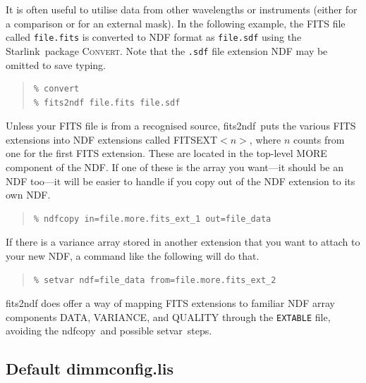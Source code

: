 \documentclass[twoside,11pt]{article}
\newcommand{\htmladdnormallink}[2]{#1}
\newcommand{\xref}[3]{#1}
\newcommand{\xlabel}[1]{}
\renewcommand{\_}{\texttt{\symbol{95}}}
\newenvironment{myquote}{
   \color{MidnightBlue}\begin{quote}\begin{small}}{
   \end{small}\end{quote}
}
\newcommand{\starlink}{\htmladdnormallink{Starlink}{http://starlink.jach.hawaii.edu}}
\newcommand{\convert}{\xref{\textsc{Convert}}{sun55}{}}
\newcommand{\task}[1]{\textsf{#1}}
\newcommand{\param}[1]{\texttt{#1}}
\newcommand{\file}[1]{\texttt{#1}}
\newcommand{\ndfcopy}{\xref{\task{ndfcopy}}{sun95}{NDFCOPY}}
\newcommand{\setvar}{\xref{\task{setvar}}{sun95}{SETVAR}}
\newcommand{\fitstondf}{\xref{\task{fits2ndf}}{sun55}{FITS2NDF}}
\renewenvironment{myquote}{
      \begin{quote}\begin{small}}{
      \end{small}\end{quote}
   }
\begin{document}
It is often useful to utilise data from other wavelengths or
instruments (either for a comparison or for an external mask). In the
following example, the FITS file called \file{file.fits} is
converted to NDF format as \file{file.sdf} using the \starlink\
package \convert. Note that the \file{.sdf} file extension NDF may
be omitted to save typing.

\begin{myquote}
\begin{verbatim}
% convert
% fits2ndf file.fits file.sdf
\end{verbatim}
\end{myquote}

Unless your FITS file is from a recognised source, \fitstondf\ puts the
various FITS extensions into NDF extensions called FITS\_EXT\_$<n>$,
where $n$ counts from one for the first FITS extension. These are
located in the top-level MORE component of the NDF. If one of these is
the array you want---it should be an NDF too---it will be easier to
handle if you copy out of the NDF extension to its own NDF.

\begin{myquote}
\begin{verbatim}
% ndfcopy in=file.more.fits_ext_1 out=file_data
\end{verbatim}
\end{myquote}

If there is a variance array stored in another extension that you want
to attach to your new NDF, a command like the following will do that.

\begin{myquote}
\begin{verbatim}
% setvar ndf=file_data from=file.more.fits_ext_2
\end{verbatim}
\end{myquote}

\task{fits2ndf} does offer a way of mapping FITS extensions to familiar NDF
array components DATA, VARIANCE, and QUALITY through the \param{EXTABLE} file,
avoiding the \ndfcopy\ and possible \setvar\ steps.


\newpage
\subsection{\xlabel{defconfig}Default dimmconfig.lis}
\label{app:dimm}
\raggedbottom
\end{document}
